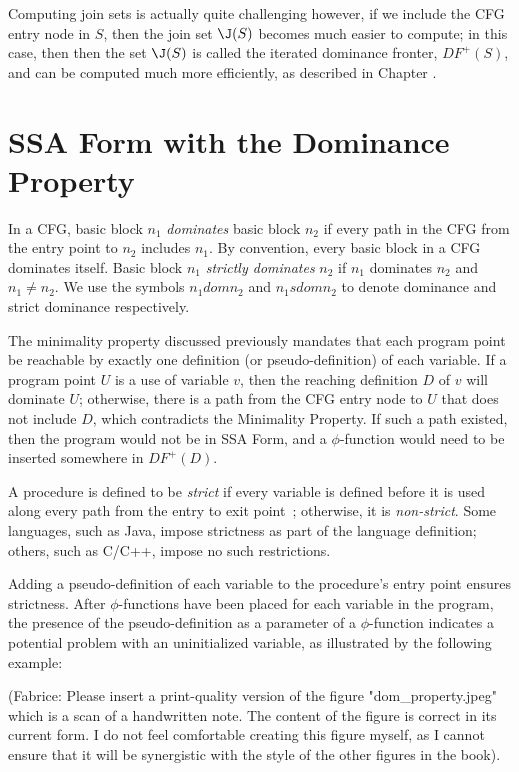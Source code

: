 Computing join sets is actually quite challenging however, if we include 
the CFG entry node in $S$, then the join set $\J(S)$ becomes much easier 
to compute; in this case, then  then the set $\J(S)$ is
called the iterated dominance fronter, $DF^{+}(S)$, and can be
computed much more efficiently, as described in Chapter 
\label{chap:classical_construction} .

\section{SSA Form with the Dominance Property}

In a CFG, basic block $n_{1}$ \emph{dominates} basic block $n_{2}$
if every path in the CFG from the entry point to $n_{2}$ includes
$n_{1}$. By convention, every basic block in a CFG dominates itself. Basic 
block $n_{1}$ \emph{strictly dominates} $n_{2}$ if $n_{1}$ dominates
$n_{2}$ and $n_{1} \neq n_{2}$. We use the symbols $n_{1} dom n_{2}$
and $n_{1} sdom n_{2}$ to denote dominance and strict dominance 
respectively.

The minimality property discussed previously mandates that each
program point be reachable by exactly one definition (or pseudo-definition)
of each variable. If a program point $U$ is a use of variable $v$, then the
reaching definition $D$ of $v$ will dominate $U$; otherwise, there is a path
from the CFG entry node to $U$ that does not include $D$, which contradicts
the Minimality Property. If such a  path existed, then the program would not
be in SSA Form, and a $\phi$-function would need to be inserted somewhere
in $DF^{+}(D)$.  

A procedure is defined to be \emph{strict} if every variable
is defined before it is used along every path from the entry
to exit point~\cite{BudimlicJun02}; otherwise, it is \emph{non-strict}. 
Some languages, such as Java, impose strictness as part of the language
definition; others, such as C/C++, impose no such restrictions. 
 
Adding a pseudo-definition of each variable to the procedure's entry
point ensures strictness. After $\phi$-functions have been placed
for each variable in the program, the presence of the pseudo-definition
as a parameter of a $\phi$-function indicates a potential problem with
an uninitialized variable, as illustrated by the following example:

(Fabrice: Please insert a print-quality version of the figure
"dom_property.jpeg" which is a scan of a handwritten note. The
content of the figure is correct in its current form. I do not feel
comfortable creating this figure myself, as I cannot ensure that
it will be synergistic with the style of the other figures in the book).  
 
